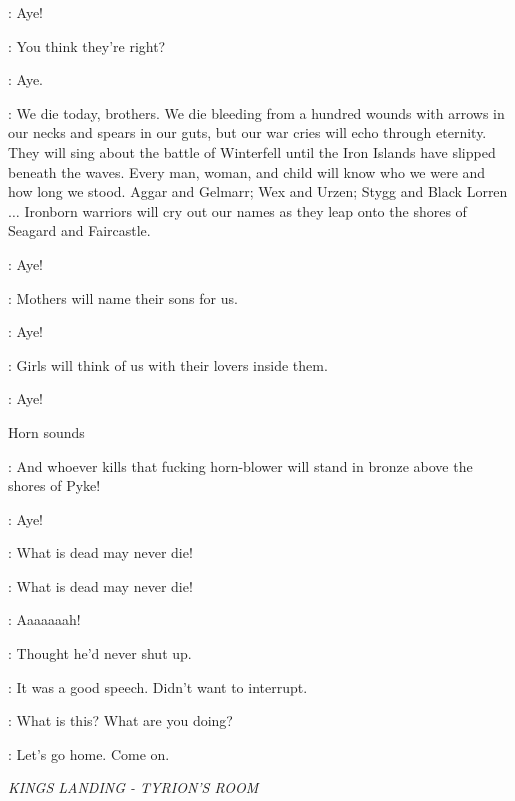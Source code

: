 \IRONBORN: Aye! 

\THEON: You think they're right? 

\IRONBORN: Aye. 

\THEON: We die today, brothers. We die bleeding from a hundred wounds with arrows in our necks and spears in our guts, but our war cries will echo through eternity. They will sing about the battle of Winterfell until the Iron Islands have slipped beneath the waves. Every man, woman, and child will know who we were and how long we stood. Aggar and Gelmarr; Wex and Urzen; Stygg and Black Lorren $\ldots$  Ironborn warriors will cry out our names as they leap onto the shores of Seagard and Faircastle. 


\IRONBORN: Aye! 

\THEON: Mothers will name their sons for us. 

\IRONBORN: Aye! 

\THEON: Girls will think of us with their lovers inside them. 

\IRONBORN: Aye! 

\sfx Horn sounds

\THEON: And whoever kills that fucking horn-blower will stand in bronze above the shores of Pyke! 

\IRONBORN: Aye! 

\THEON: What is dead may never die! 

\IRONBORN: What is dead may never die! 

\THEON:  Aaaaaaah! 


\LORREN: Thought he'd never shut up. 

\DAGMER: It was a good speech. Didn't want to interrupt. 


\LUWIN: What is this? What are you doing? 


\DAGMER:  Let's go home. Come on. 


\scene

\textit{KINGS LANDING - TYRION'S ROOM} 

